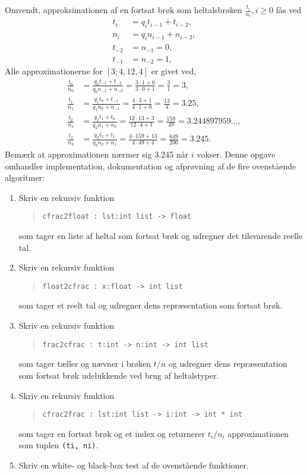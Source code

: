 \documentclass[a4paper,12pt]{article}
\begin{document}
Omvendt, approksimationen af en fortsat brøk som heltalsbrøken $\frac{t_i}{n_i}, i \geq 0$ fås ved
\begin{align}
  t_i &= q_it_{i-1}+t_{i-2},
  \\n_i &= q_in_{i-1}+n_{i-2},
  \\t_{-2} &= n_{-1} = 0,
  \\t_{-1} &= n_{-2} =1,
\end{align}
Alle approximationerne for $[3; 4, 12, 4]$ er givet ved,
\begin{align}
  \frac{t_0}{n_0} &= \frac{q_0t_{-1} + t_{-2}}{q_0n_{-1}+n_{-2}} = \frac{3\cdot 1+0}{3\cdot 0 + 1} = \frac{3}{1} = 3,
  \\\frac{t_1}{n_1} &= \frac{q_1t_0 + t_{-1}}{q_1n_0+n_{-1}} = \frac{4\cdot 3 + 1}{4\cdot 1+0} = \frac{13}{4} = 3.25,
  \\\frac{t_2}{n_2} &= \frac{q_2t_1 + t_{0}}{q_2n_1+n_{0}} = \frac{12\cdot 13 + 3}{12\cdot 4 + 1} = \frac{159}{49} = 3.244897959\ldots,
  \\\frac{t_3}{n_3} &= \frac{q_3t_2 + t_{1}}{q_3n_2+n_{1}} = \frac{4\cdot 159 + 13}{4\cdot 49+4} = \frac{649}{200} = 3.245.
\end{align}
Bemærk at approximationen nærmer sig 3.245 når $i$ vokser.
\newpage
Denne opgave omhandler implementation, dokumentation og afprøvning af de fire ovenstående algoritmer:
\begin{enumerate}[label=6g.\arabic*,start=0]
\item Skriv en rekursiv funktion
  \begin{quote}
    \lstinline{cfrac2float : lst:int list -> float}
  \end{quote}
  som tager en liste af heltal som fortsat brøk og udregner det tilsvarende reelle tal.
\item Skriv en rekursiv funktion
  \begin{quote}
    \lstinline{float2cfrac : x:float -> int list}
  \end{quote}
  som tager et reelt tal og udregner dens repræsentation som fortsat brøk.
\item Skriv en rekursiv funktion
  \begin{quote}
    \lstinline{frac2cfrac : t:int -> n:int -> int list}
  \end{quote}
  som tager tæller og nævner i brøken $t/n$ og udregner dens repræsentation som fortsat brøk udelukkende ved brug af heltalstyper.
\item Skriv en rekursiv funktion
  \begin{quote}
    \lstinline{cfrac2frac : lst:int list -> i:int -> int * int}
  \end{quote}
  som tager en fortsat brøk og et index og returnerer $t_i/n_i$ approximationen som tuplen \lstinline{(ti, ni)}.
\item Skriv en white- og black-box test af de ovenstående funktioner.
\end{enumerate}
\end{document}
